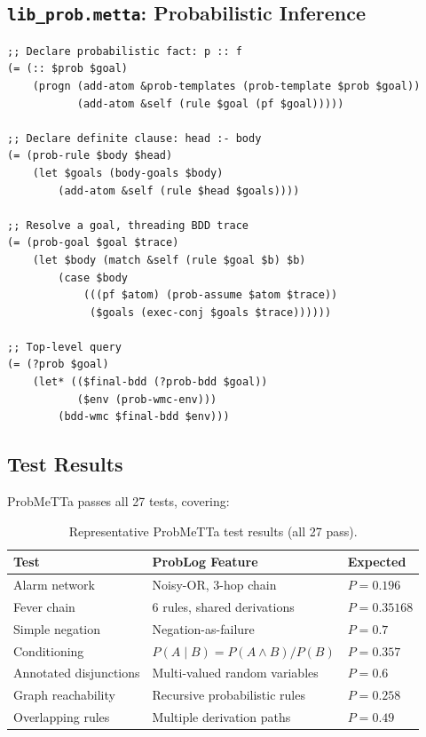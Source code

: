 \documentclass[11pt,a4paper]{article}
\theoremstyle{definition}
\begin{document}
\subsection{\texttt{lib\_prob.metta}: Probabilistic Inference}

\begin{lstlisting}[language=MeTTa]
;; Declare probabilistic fact: p :: f
(= (:: $prob $goal)
    (progn (add-atom &prob-templates (prob-template $prob $goal))
           (add-atom &self (rule $goal (pf $goal)))))

;; Declare definite clause: head :- body
(= (prob-rule $body $head)
    (let $goals (body-goals $body)
        (add-atom &self (rule $head $goals))))

;; Resolve a goal, threading BDD trace
(= (prob-goal $goal $trace)
    (let $body (match &self (rule $goal $b) $b)
        (case $body
            (((pf $atom) (prob-assume $atom $trace))
             ($goals (exec-conj $goals $trace))))))

;; Top-level query
(= (?prob $goal)
    (let* (($final-bdd (?prob-bdd $goal))
           ($env (prob-wmc-env)))
        (bdd-wmc $final-bdd $env)))
\end{lstlisting}

\subsection{Test Results}

ProbMeTTa passes all 27 tests, covering:

\begin{table}[h]
\centering
\begin{tabular}{lll}
\toprule
\textbf{Test} & \textbf{ProbLog Feature} & \textbf{Expected} \\
\midrule
Alarm network & Noisy-OR, 3-hop chain & $P = 0.196$ \\
Fever chain & 6 rules, shared derivations & $P = 0.35168$ \\
Simple negation & Negation-as-failure & $P = 0.7$ \\
Conditioning & $P(A \mid B) = P(A \wedge B)/P(B)$ & $P = 0.357$ \\
Annotated disjunctions & Multi-valued random variables & $P = 0.6$ \\
Graph reachability & Recursive probabilistic rules & $P = 0.258$ \\
Overlapping rules & Multiple derivation paths & $P = 0.49$ \\
\bottomrule
\end{tabular}
\caption{Representative ProbMeTTa test results (all 27 pass).}
\end{table}
\end{document}
